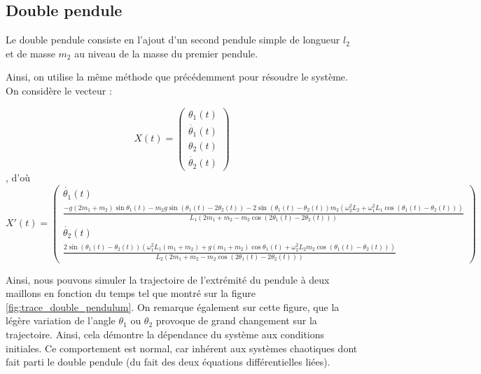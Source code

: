 \subsection{Double pendule}
Le double pendule consiste en l'ajout d'un second pendule simple de longueur $l_2$ et de masse $m_2$ au niveau de la masse du premier pendule.

Ainsi, on utilise la même méthode que précédemment pour résoudre le système. On considère le vecteur : 

\vspace{4.00mm}
\begin{equation}
    X(t) = \begin{pmatrix} \theta_1(t) \\ \dot{\theta_1}(t) \\ \theta_2(t) \\ \dot{\theta_2}(t) \end{pmatrix}
\end{equation}
, d'où 
\begin{equation}
    X'(t) = \begin{pmatrix} \dot{\theta_1}(t) \\ \frac{-g(2m_1 + m_2)\sin{\theta_1(t)}-m_2g\sin(\theta_1(t)-2\theta_2(t))-2\sin(\theta_1(t) - \theta_2(t))m_2(\omega^{2}_2L_2+\omega^{2}_1L_1\cos(\theta_1(t) - \theta_2(t)))}{L_1(2m_1+m_2-m_2\cos(2\theta_1(t) - 2 \theta_2(t)))} \\ \dot{\theta_2}(t) \\ \frac{2\sin(\theta_1(t) - \theta_2(t))(\omega^{2}_1L_1(m_1+m_2)+g(m_1 + m_2)\cos{\theta_1(t)} + \omega^{2}_2L_2m_2\cos(\theta_1(t) - \theta_2(t)))}{L_2(2m_1+m_2-m_2\cos(2\theta_1(t) - 2 \theta_2(t)))} \end{pmatrix}
\end{equation}

Ainsi, nous pouvons simuler la trajectoire de l'extrémité du pendule à deux maillons en fonction du temps tel que montré sur la figure \ref{fig:trace_double_pendulum}. On remarque également sur cette figure, que la légère variation de l'angle $\theta_1$ ou $\theta_2$ provoque de grand changement sur la trajectoire. Ainsi, cela démontre la dépendance du système aux conditions initiales. Ce comportement est normal, car inhérent aux systèmes chaotiques dont fait parti le double pendule (du fait des deux équations différentielles liées).


